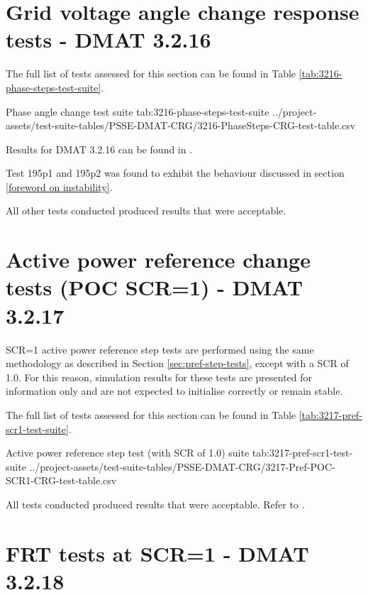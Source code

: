 \documentclass{../grid-link-report}
\newcommand{\projectassetsdir}{../project-assets}
\begin{document}
	\section{Grid voltage angle change response tests - DMAT 3.2.16}		
	
	
	
	The full list of tests assessed for this section can be found in Table \ref{tab:3216-phase-steps-test-suite}.
	
	{
		\fontsize{7}{9}\selectfont
		\autoscaledlongtable
		{Phase angle change test suite}
		{tab:3216-phase-steps-test-suite}
		{\projectassetsdir/test-suite-tables/PSSE-DMAT-CRG/3216-PhaseSteps-CRG-test-table.csv}
	}
	
	Results for DMAT 3.2.16 can be found in .
	
	Test 195p1 and 195p2 was found to exhibit the behaviour discussed in section \ref{foreword on instability}.
	
	All other tests conducted produced results that were acceptable.
	
	
	\section{Active power reference change tests (POC SCR=1) - DMAT 3.2.17}		
	
	SCR=1 active power reference step tests are performed using the same methodology as described in Section \ref{sec:pref-step-tests}, except with a \ac{SCR} of 1.0. For this reason, simulation results for these tests are presented for information only and are not expected to initialise correctly or remain stable.
	
	The full list of tests assessed for this section can be found in Table \ref{tab:3217-pref-scr1-test-suite}.
	
	{
		\fontsize{7}{9}\selectfont
		\autoscaledlongtable
		{Active power reference step test (with SCR of 1.0) suite}
		{tab:3217-pref-scr1-test-suite}
		{\projectassetsdir/test-suite-tables/PSSE-DMAT-CRG/3217-Pref-POC-SCR1-CRG-test-table.csv}
	}
	
	All tests conducted produced results that were acceptable. Refer to .
	
	
	\section{FRT tests at SCR=1 - DMAT 3.2.18}		
	
\end{document}
